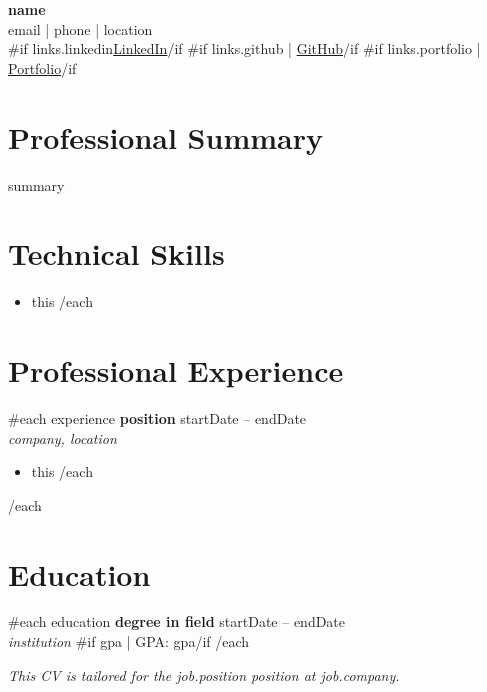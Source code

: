\documentclass[11pt,a4paper]{article}
\begin{document}
\begin{center}
  {\LARGE \textbf{ {{name}} }}\\[0.2cm]
  {{email}} | {{phone}} | {{location}}\\
  {{#if links.linkedin}}\href{ {{links.linkedin}} }{LinkedIn}{{/if}}
  {{#if links.github}} | \href{ {{links.github}} }{GitHub}{{/if}}
  {{#if links.portfolio}} | \href{ {{links.portfolio}} }{Portfolio}{{/if}}
\end{center}

\vspace{0.3cm}

\section*{Professional Summary}
{{summary}}

\vspace{0.2cm}

\section*{Technical Skills}
\begin{itemize}[leftmargin=*,noitemsep]
{{#each skills}}
  \item {{this}}
{{/each}}
\end{itemize}

\vspace{0.2cm}

\section*{Professional Experience}

{{#each experience}}
\textbf{ {{position}} } \hfill {{startDate}} -- {{endDate}}\\
\textit{ {{company}}, {{location}} }
\begin{itemize}[leftmargin=*,noitemsep]
{{#each description}}
  \item {{this}}
{{/each}}
\end{itemize}
\vspace{0.2cm}
{{/each}}

\section*{Education}

{{#each education}}
\textbf{ {{degree}} in {{field}} } \hfill {{startDate}} -- {{endDate}}\\
\textit{ {{institution}} }{{#if gpa}} | GPA: {{gpa}}{{/if}}
\vspace{0.2cm}
{{/each}}

\vspace{0.5cm}

\textit{This CV is tailored for the {{job.position}} position at {{job.company}}.}
\end{document}
